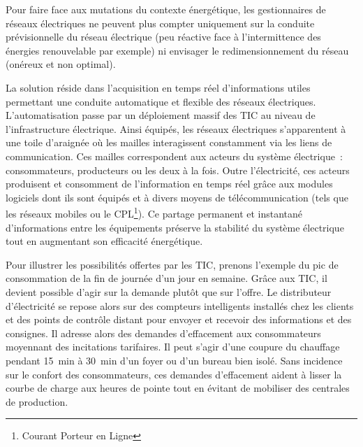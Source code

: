 Pour faire face aux mutations du contexte énergétique, les gestionnaires de 
réseaux électriques ne peuvent plus compter uniquement sur la conduite 
prévisionnelle du réseau électrique (peu réactive face à l'intermittence des 
énergies renouvelable par exemple) ni envisager le redimensionnement du réseau 
(onéreux et non optimal). 

La solution réside dans l'acquisition en temps réel d'informations utiles 
permettant une conduite automatique et flexible des réseaux électriques. 
L'automatisation passe par un déploiement massif des TIC au niveau de 
l'infrastructure électrique. Ainsi équipés, les réseaux électriques 
s'apparentent à une toile d'araignée où les mailles interagissent 
constamment via les liens de communication. Ces mailles correspondent aux 
acteurs du système électrique~: consommateurs, producteurs ou les deux à la 
fois. Outre l'électricité, ces acteurs produisent et consomment de l'information 
en 
temps réel grâce aux modules logiciels dont ils sont équipés et à divers moyens 
de 
télécommunication (tels que les réseaux mobiles ou le CPL\footnote{Courant 
Porteur en Ligne}). Ce partage permanent et instantané d'informations entre les 
équipements préserve la stabilité du système électrique tout en augmentant son 
efficacité énergétique. 

Pour illustrer les possibilités offertes par les TIC, prenons l'exemple du pic 
de consommation de la fin de journée d'un jour en semaine. Grâce aux TIC, il 
devient possible d'agir sur la demande plutôt que sur l'offre. Le distributeur 
d'électricité se repose alors sur des compteurs intelligents installés chez les 
clients et des points de contrôle distant pour envoyer et recevoir des 
informations et des consignes. Il adresse alors des demandes d'effacement aux 
consommateurs moyennant des incitations tarifaires. Il peut s'agir d'une coupure 
du chauffage pendant 15~min à 30~min d'un foyer ou d'un bureau bien isolé. Sans 
incidence sur le confort des consommateurs, ces demandes d'effacement aident à 
lisser la courbe de charge aux heures de pointe tout en évitant de mobiliser des 
centrales de production. 

